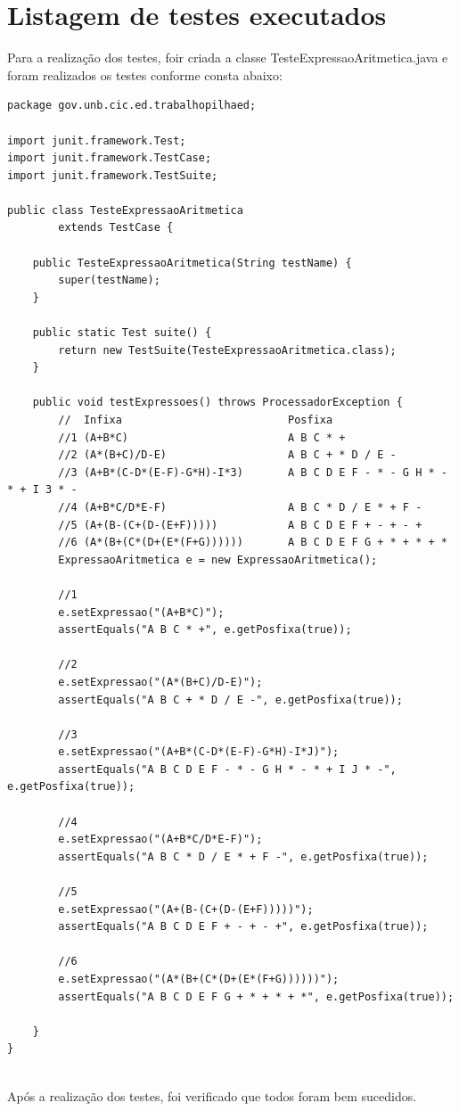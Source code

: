 \documentclass[a4paper,11pt]{article}
\begin{document}
\section{Listagem de testes executados}
Para a realização dos testes, foir criada a classe TesteExpressaoAritmetica.java e foram realizados os testes conforme consta abaixo:
\begin{lstlisting}
package gov.unb.cic.ed.trabalhopilhaed;

import junit.framework.Test;
import junit.framework.TestCase;
import junit.framework.TestSuite;

public class TesteExpressaoAritmetica
        extends TestCase {

    public TesteExpressaoAritmetica(String testName) {
        super(testName);
    }

    public static Test suite() {
        return new TestSuite(TesteExpressaoAritmetica.class);
    }

    public void testExpressoes() throws ProcessadorException {
        //  Infixa                          Posfixa
        //1 (A+B*C)                         A B C * +
        //2 (A*(B+C)/D-E)                   A B C + * D / E -
        //3 (A+B*(C-D*(E-F)-G*H)-I*3)       A B C D E F - * - G H * - * + I 3 * -
        //4 (A+B*C/D*E-F)                   A B C * D / E * + F -
        //5 (A+(B-(C+(D-(E+F)))))           A B C D E F + - + - +
        //6 (A*(B+(C*(D+(E*(F+G))))))       A B C D E F G + * + * + *
        ExpressaoAritmetica e = new ExpressaoAritmetica();
        
        //1
        e.setExpressao("(A+B*C)");
        assertEquals("A B C * +", e.getPosfixa(true));
        
        //2
        e.setExpressao("(A*(B+C)/D-E)");
        assertEquals("A B C + * D / E -", e.getPosfixa(true));
        
        //3
        e.setExpressao("(A+B*(C-D*(E-F)-G*H)-I*J)");
        assertEquals("A B C D E F - * - G H * - * + I J * -", e.getPosfixa(true));
        
        //4
        e.setExpressao("(A+B*C/D*E-F)");
        assertEquals("A B C * D / E * + F -", e.getPosfixa(true));
        
        //5
        e.setExpressao("(A+(B-(C+(D-(E+F)))))");
        assertEquals("A B C D E F + - + - +", e.getPosfixa(true));
        
        //6
        e.setExpressao("(A*(B+(C*(D+(E*(F+G))))))");
        assertEquals("A B C D E F G + * + * + *", e.getPosfixa(true));                
        
    }
}


\end{lstlisting}
Após a realização dos testes, foi verificado que todos foram bem sucedidos. 
\end{document}
